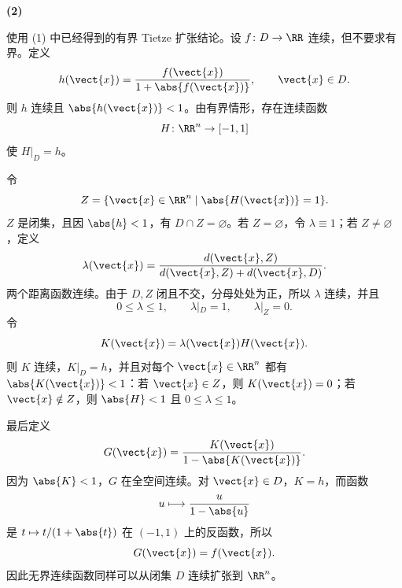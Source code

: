 \textbf{(2)}
\begin{xsolution}
使用 (1) 中已经得到的有界 Tietze 扩张结论。设 $f\colon D\to\RR$ 连续，但不要求有界。定义
\[
  h(\vect{x})
  =\frac{f(\vect{x})}{1+\abs{f(\vect{x})}},
  \qquad\vect{x}\in D.
\]
则 $h$ 连续且 $\abs{h(\vect{x})}<1$。由有界情形，存在连续函数
\[
  H\colon\RR^n\to[-1,1]
\]
使 $H|_D=h$。

令
\[
  Z=\{\vect{x}\in\RR^n\mid\abs{H(\vect{x})}=1\}.
\]
$Z$ 是闭集，且因 $\abs{h}<1$，有 $D\cap Z=\varnothing$。若 $Z=\varnothing$，令 $\lambda\equiv1$；若 $Z\ne\varnothing$，定义
\[
  \lambda(\vect{x})
  =\frac{d(\vect{x},Z)}
  {d(\vect{x},Z)+d(\vect{x},D)}.
\]
两个距离函数连续。由于 $D,Z$ 闭且不交，分母处处为正，所以 $\lambda$ 连续，并且
\[
  0\le\lambda\le1,
  \qquad
  \lambda|_D=1,
  \qquad
  \lambda|_Z=0.
\]
令
\[
  K(\vect{x})=\lambda(\vect{x})H(\vect{x}).
\]
则 $K$ 连续，$K|_D=h$，并且对每个 $\vect{x}\in\RR^n$ 都有 $\abs{K(\vect{x})}<1$：若 $\vect{x}\in Z$，则 $K(\vect{x})=0$；若 $\vect{x}\notin Z$，则 $\abs{H}<1$ 且 $0\le\lambda\le1$。

最后定义
\[
  G(\vect{x})
  =\frac{K(\vect{x})}{1-\abs{K(\vect{x})}}.
\]
因为 $\abs{K}<1$，$G$ 在全空间连续。对 $\vect{x}\in D$，$K=h$，而函数
\[
  u\longmapsto\frac{u}{1-\abs{u}}
\]
是 $t\mapsto t/(1+\abs{t})$ 在 $(-1,1)$ 上的反函数，所以
\[
  G(\vect{x})=f(\vect{x}).
\]
因此无界连续函数同样可以从闭集 $D$ 连续扩张到 $\RR^n$。
\end{xsolution}

